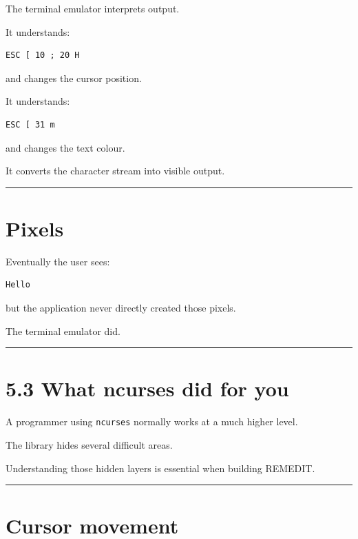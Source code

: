 \documentclass[
  oneside,
  openany]{book}
\begin{document}
The terminal emulator interprets output.

It understands:

\begin{verbatim}
ESC [ 10 ; 20 H
\end{verbatim}

and changes the cursor position.

It understands:

\begin{verbatim}
ESC [ 31 m
\end{verbatim}

and changes the text colour.

It converts the character stream into visible output.

\begin{center}\rule{0.5\linewidth}{0.5pt}\end{center}

\hypertarget{pixels}{%
\section{Pixels}\label{pixels}}

Eventually the user sees:

\begin{verbatim}
Hello
\end{verbatim}

but the application never directly created those pixels.

The terminal emulator did.

\begin{center}\rule{0.5\linewidth}{0.5pt}\end{center}

\hypertarget{what-ncurses-did-for-you}{%
\section{5.3 What ncurses did for you}\label{what-ncurses-did-for-you}}

A programmer using \texttt{ncurses} normally works at a much higher
level.

The library hides several difficult areas.

Understanding those hidden layers is essential when building REMEDIT.

\begin{center}\rule{0.5\linewidth}{0.5pt}\end{center}

\hypertarget{cursor-movement}{%
\section{Cursor movement}\label{cursor-movement}}
\end{document}
